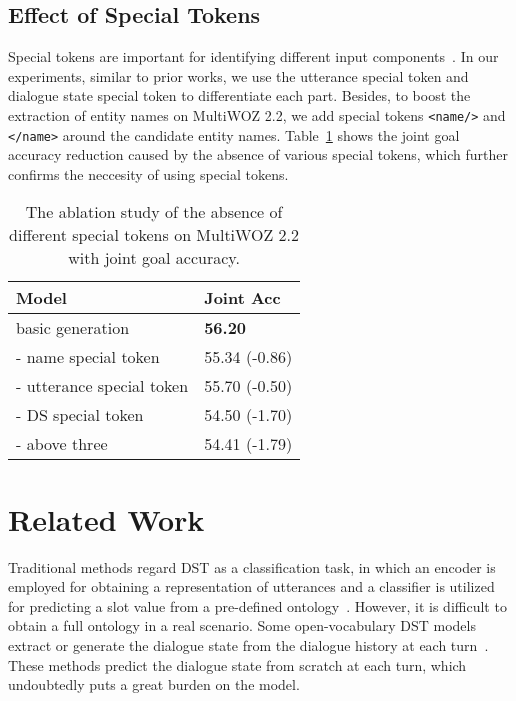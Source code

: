 \documentclass[11pt]{article}
\begin{document}
\subsection{Effect of Special Tokens}
Special tokens are important for identifying different input components~\citep{NEURIPS2020_e9462095}. In our experiments, similar to prior works, we use the utterance special token and dialogue state special token to differentiate each part. Besides, to boost the extraction of entity names on MultiWOZ 2.2, we add special tokens \texttt{<name/>} and \texttt{</name>} around the candidate entity names. Table~\ref{tab:ablation-token} shows the joint goal accuracy reduction caused by the absence of various special tokens, which further confirms the neccesity of using special tokens.

\begin{table}
\centering
\begin{tabular}{ll}
\hline
\textbf{Model} & \textbf{Joint Acc} \\
\hline
\hline
basic generation & \textbf{56.20} \\
\hline
\quad - name special token & 55.34 (-0.86) \\
\quad - utterance special token & 55.70 (-0.50) \\
\quad - DS special token & 54.50 (-1.70) \\
\quad - above three & 54.41 (-1.79) \\
\hline
\end{tabular}
\caption{The ablation study of the absence of different special tokens on MultiWOZ 2.2 with joint goal accuracy.}\label{tab:ablation-token}
\end{table}

\section{Related Work}
Traditional methods regard DST as a classification task, in which an encoder is employed for obtaining a representation of utterances and a classifier is utilized for predicting a slot value from a pre-defined ontology~\citep{mrksic-etal-2017-neural,zhong-etal-2018-global,ramadan-etal-2018-large}. However, it is difficult to obtain a full ontology in a real scenario. Some open-vocabulary DST models extract or generate the dialogue state from the dialogue history at each turn~\citep{Chao2019,NEURIPS2020_e9462095,ham-etal-2020-end,heck-etal-2020-trippy}. These methods predict the dialogue state from scratch at each turn, which undoubtedly puts a great burden on the model.
\end{document}
